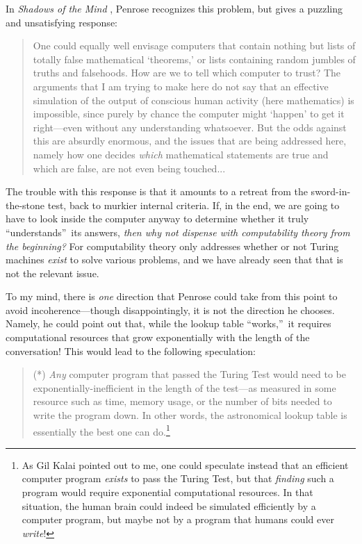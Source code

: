 \documentclass[12pt,onecolumn]{article}%
\begin{document}
In \textit{Shadows of the Mind} \cite[p. 83]{penrose:shadows}, Penrose
recognizes this problem, but gives a puzzling and unsatisfying response:

\begin{quotation}
\noindent One could equally well envisage computers that contain nothing but
lists of totally false mathematical `theorems,' or lists containing random
jumbles of truths and falsehoods. How are we to tell which computer to
trust? The arguments that I am trying to make here do not say that an
effective simulation of the output of conscious human activity (here
mathematics) is impossible, since purely by chance the computer might `happen'
to get it right---even without any understanding whatsoever. But the odds
against this are absurdly enormous, and the issues that are being addressed
here, namely how one decides \textit{which} mathematical statements are true
and which are false, are not even being touched...
\end{quotation}

The trouble with this response is that it amounts to a retreat from the
sword-in-the-stone test, back to murkier internal criteria. If, in the end, we
are going to have to look inside the computer anyway to determine whether it
truly \textquotedblleft understands\textquotedblright\  its answers,
\textit{then why not dispense with computability theory from the beginning?}
 For computability theory only addresses whether or not Turing machines
\textit{exist} to solve various problems, and we have already seen that that
is not the relevant issue.

To my mind, there is \textit{one} direction that Penrose could take from this
point to avoid incoherence---though disappointingly, it is not the direction
he chooses. Namely, he could point out that, while the lookup table
\textquotedblleft works,\textquotedblright\  it requires computational
resources that grow exponentially\textit{ }with the length of the
conversation! This would lead to the following speculation:

\begin{quotation}
\noindent(*) \textit{Any} computer program that passed the Turing Test would
need to be exponentially-inefficient in the length of the test---as measured
in some resource such as time, memory usage, or the number of bits needed to
write the program down. In other words, the astronomical lookup table is
essentially the best one can do.\footnote{As Gil Kalai pointed out to me, one
could speculate instead that an efficient computer program \textit{exists} to
pass the Turing Test, but that \textit{finding} such a program would require
exponential computational resources. In that situation, the human brain
could indeed be simulated efficiently by a computer program, but maybe not by
a program that humans could ever \textit{write}!}
\end{quotation}
\end{document}
